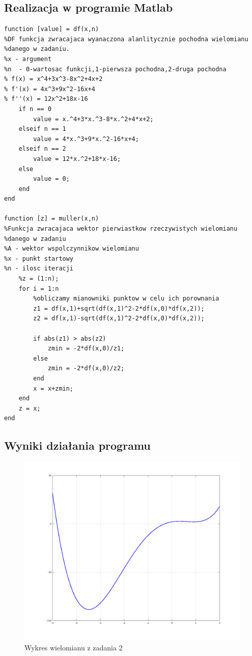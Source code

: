 \documentclass[a4paper, 11pt]{article}
\begin{document}
\subsection{Realizacja w programie Matlab}
\begin{lstlisting}
function [value] = df(x,n)
%DF funkcja zwracajaca wyanaczona alanlitycznie pochodna wielomianu
%danego w zadaniu. 
%x - argument
%n  - 0-wartosac funkcji,1-pierwsza pochodna,2-druga pochodna
% f(x) = x^4+3x^3-8x^2+4x+2
% f'(x) = 4x^3+9x^2-16x+4
% f''(x) = 12x^2+18x-16
    if n == 0
        value = x.^4+3*x.^3-8*x.^2+4*x+2; 
    elseif n == 1
        value = 4*x.^3+9*x.^2-16*x+4;
    elseif n == 2
        value = 12*x.^2+18*x-16;
    else
        value = 0; 
    end
end

function [z] = muller(x,n)
%Funkcja zwracajaca wektor pierwiastkow rzeczywistych wielomianu
%danego w zadaniu
%A - wektor wspolczynnikow wielomianu
%x - punkt startowy
%n - ilosc iteracji
    %z = (1:n); 
    for i = 1:n
        %obliczamy mianowniki punktow w celu ich porownania
        z1 = df(x,1)+sqrt(df(x,1)^2-2*df(x,0)*df(x,2));
        z2 = df(x,1)-sqrt(df(x,1)^2-2*df(x,0)*df(x,2)); 
    
        if abs(z1) > abs(z2)
            zmin = -2*df(x,0)/z1; 
        else 
            zmin = -2*df(x,0)/z2;
        end 
        x = x+zmin; 
    end
    z = x; 
end

\end{lstlisting}

\vspace{1cm}

\subsection{Wyniki działania programu}

\begin{figure}[H]
\caption{Wykres wielomianu z zadania 2}
\includegraphics[width=\textwidth]{2}
\end{figure}
\end{document}
